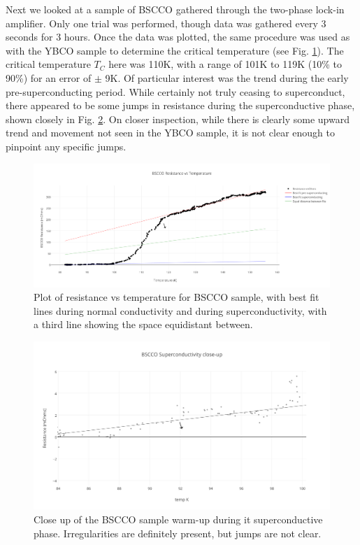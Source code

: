 \documentclass[prb,preprint]{revtex4-1}
\begin{document}
Next we looked at a sample of BSCCO gathered through the two-phase lock-in amplifier. Only one trial was performed, though data was gathered every 3 seconds for 3 hours. Once the data was plotted, the same procedure was used as with the YBCO sample to determine the critical temperature (see Fig. \ref{BSCCOplot1}). The critical temperature $T_C$ here was 110K, with a range of 101K to 119K (10\% to 90\%) for an error of $\pm$ 9K. Of particular interest was the trend during the early pre-superconducting period. While certainly not truly ceasing to superconduct, there appeared to be some jumps in resistance during the superconductive phase, shown closely in Fig. \ref{BSCCOplot2}. On closer inspection, while there is clearly some upward trend and movement not seen in the YBCO sample, it is not clear enough to pinpoint any specific jumps.

\begin{figure}[h!]
\centering
\includegraphics[width=7in]{bscco_resistance_vs_temperature.png}
\caption{Plot of resistance vs temperature for BSCCO sample, with best fit lines during normal conductivity and during superconductivity, with a third line showing the space equidistant between.}
\label{BSCCOplot1}
\end{figure}

\begin{figure}[h!]
\centering
\includegraphics[width=7in]{bscco_superconductivity_close-up.png}
\caption{Close up of the BSCCO sample warm-up during it superconductive phase. Irregularities are definitely present, but jumps are not clear.}
\label{BSCCOplot2}
\end{figure}
\end{document}
